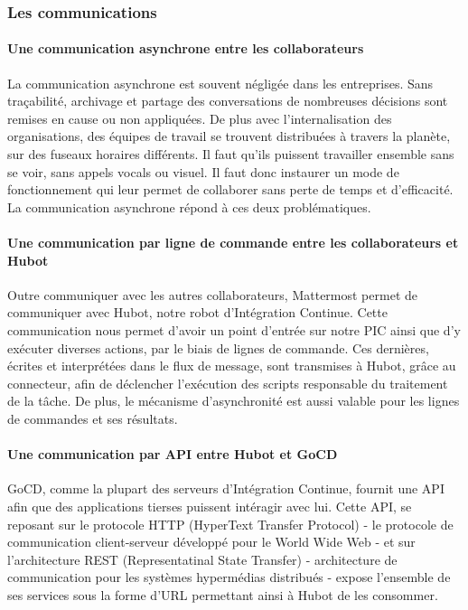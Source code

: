         \subsubsection{Les communications}
          \paragraph{Une communication asynchrone entre les collaborateurs}
          La communication asynchrone est souvent négligée dans les entreprises. Sans traçabilité, archivage et partage des conversations de nombreuses décisions sont remises en cause ou non appliquées. De plus avec l'internalisation des organisations, des équipes de travail se trouvent distribuées à travers la planète, sur des fuseaux horaires différents. Il faut qu'ils puissent travailler ensemble sans se voir, sans appels vocals ou visuel. Il faut donc instaurer un mode de fonctionnement qui leur permet de collaborer sans perte de temps et d'efficacité. La communication asynchrone répond à ces deux problématiques.

          \paragraph{Une communication par ligne de commande entre les collaborateurs et Hubot}
          Outre communiquer avec les autres collaborateurs, Mattermost permet de communiquer avec Hubot, notre robot d'Intégration Continue. Cette communication nous permet d'avoir un point d'entrée sur notre PIC ainsi que d'y exécuter diverses actions, par le biais de lignes de commande. Ces dernières, écrites et interprétées dans le flux de message, sont transmises à Hubot, grâce au connecteur, afin de déclencher l'exécution des scripts responsable du traitement de la tâche. De plus, le mécanisme d'asynchronité est aussi valable pour les lignes de commandes et ses résultats.

          \paragraph{Une communication par API entre Hubot et GoCD}
          GoCD, comme la plupart des serveurs d'Intégration Continue, fournit une API afin que des applications tierses puissent intéragir avec lui. Cette API, se reposant sur le protocole HTTP (HyperText Transfer Protocol) - le protocole de communication client-serveur développé pour le World Wide Web - et sur l'architecture REST (Representatinal State Transfer) - architecture de communication pour les systèmes hypermédias distribués - expose l'ensemble de ses services sous la forme d'URL permettant ainsi à Hubot de les consommer.


